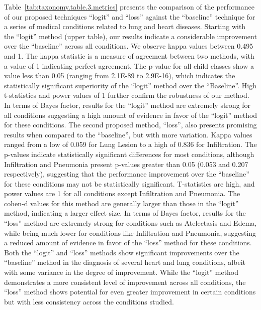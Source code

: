 Table~\ref{tab:taxonomy.table.3.metrics} presents the comparison of the performance of our proposed techniques ``logit'' and ``loss'' against the ``baseline'' technique for a series of medical conditions related to lung and heart diseases.
Starting with the ``logit'' method (upper table), our results indicate a considerable improvement over the ``baseline'' across all conditions. We observe kappa values between 0.495 and 1. The kappa statistic is a measure of agreement between two methods, with a value of 1 indicating perfect agreement. The p-value for all child classes show a value less than 0.05 (ranging from 2.1E-89 to 2.9E-16), which indicates the statistically significant superiority of the ``logit'' method over the ``Baseline''. High t-statistics and power values of 1 further confirm the robustness of our method. In terms of Bayes factor, results for the ``logit'' method are extremely strong for all conditions suggesting a high amount of evidence in favor of the ``logit'' method for these conditions.
The second proposed method, ``loss'', also presents promising results when compared to the ``baseline'', but with more variation. Kappa values ranged from a low of 0.059 for Lung Lesion to a high of 0.836 for Infiltration. The p-values indicate statistically significant differences for most conditions, although Infiltration and Pneumonia present p-values greater than 0.05 (0.053 and 0.207 respectively), suggesting that the performance improvement over the ``baseline'' for these conditions may not be statistically significant. T-statistics are high, and power values are 1 for all conditions except Infiltration and Pneumonia. The cohen-d values for this method are generally larger than those in the ``logit'' method, indicating a larger effect size. In terms of Bayes factor, results for the ``loss'' method are extremely strong for conditions such as Atelectasis and Edema, while being much lower for conditions like Infiltration and Pneumonia, suggesting a reduced amount of evidence in favor of the ``loss'' method for these conditions.
Both the ``logit'' and ``loss'' methods show significant improvements over the ``baseline'' method in the diagnosis of several heart and lung conditions, albeit with some variance in the degree of improvement. While the ``logit'' method demonstrates a more consistent level of improvement across all conditions, the ``loss'' method shows potential for even greater improvement in certain conditions but with less consistency across the conditions studied.

